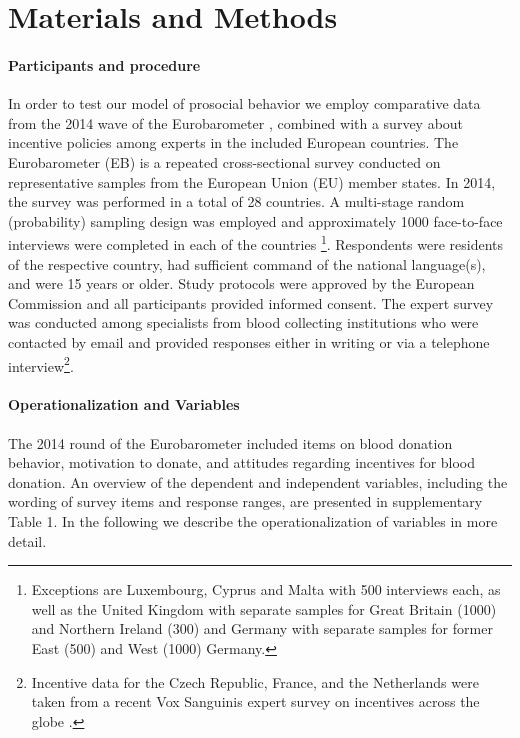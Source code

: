 \documentclass[AER]{AEA}
\begin{document}
\section{Materials and Methods}

\paragraph{Participants and procedure}

In order to test our model of prosocial behavior we employ comparative data from the 2014 wave of the Eurobarometer \citep{european_commission_eurobarometer_2014}, combined with a survey about incentive policies among experts in the included European countries. The Eurobarometer (EB) is a repeated cross-sectional survey conducted on representative samples from the European Union (EU) member states. In 2014, the survey was performed in a total of 28 countries. A multi-stage random (probability) sampling design was employed and approximately 1000 face-to-face interviews were completed in each of the countries \footnote{Exceptions are Luxembourg, Cyprus and Malta with 500 interviews each, as well as the United Kingdom with separate samples for Great Britain (1000) and Northern Ireland (300) and Germany with separate samples for former East (500) and West (1000) Germany.}. Respondents were residents of the respective country, had sufficient command of the national language(s), and were 15 years or older. Study protocols were approved by the European Commission and all participants provided informed consent. The expert survey was conducted among specialists from blood collecting institutions who were contacted by email and provided responses either in writing or via a telephone interview\footnote{Incentive data for the Czech Republic, France, and the Netherlands were taken from a recent Vox Sanguinis expert survey on incentives across the globe \citep{zeller_vox_2020}.}.

\paragraph{Operationalization and Variables}

The 2014 round of the Eurobarometer included items on blood donation behavior, motivation to donate, and attitudes regarding incentives for blood donation. An overview of the dependent and independent variables, including the wording of survey items and response ranges, are presented in supplementary Table 1. In the following we describe the operationalization of variables in more detail.
\end{document}
